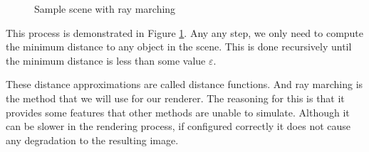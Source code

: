 \documentclass[../pbr.tex]{subfile}
\begin{document}
\begin{figure}[htpb]
\begin{center}
\end{center}
\caption{Sample scene with ray marching}%
\label{fig:p1_2d_scene3}
\end{figure}

This process is demonstrated in Figure \ref{fig:p1_2d_scene3}. Any any step, we
only need to compute the minimum distance to any object in the scene. This is
done recursively until the minimum distance is less than some value
$\varepsilon$.

These distance approximations are called distance functions. And ray marching
is the method that we will use for our renderer. The reasoning for this is that
it provides some features that other methods are unable to simulate. Although
it can be slower in the rendering process, if configured correctly it does not
cause any degradation to the resulting image.
\end{document}
